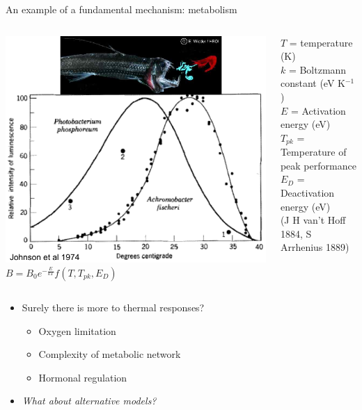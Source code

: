 \documentclass[xcolor=x11names,handout,compress]{beamer}
\renewcommand{\(}{\begin{columns}}
\renewcommand{\)}{\end{columns}}
\newcommand{\<}[1]{\begin{column}{#1}}
\renewcommand{\>}{\end{column}}
\begin{document}
\begin{frame}{An example of a fundamental mechanism: metabolism}
      
\begin{columns}[c]
  \column{2.1in}
    \pause
      \includegraphics[width=\textwidth]{graphics/Photobacterium.pdf}
  \pause
  \column{2.7in}
    $B = B_0 \boxed {e^{-\frac{E}{kT}}}f(T,T_{pk},E_D)$\\
    \vspace{10pt}
    \raggedright{$T$ = temperature (K)\\
     $k$ = Boltzmann constant (eV K$^{-1}$)}\\
     $E$ = Activation energy (eV)\\
     $T_{pk}$ = Temperature of peak performance\\
     $E_D$ = Deactivation energy (eV)\\
    {\small (J H van't Hoff 1884, S Arrhenius 1889)}
\end{columns}

\begin{itemize}\setlength{\itemindent}{0em}
  \pause
  \item Surely there is more to thermal responses?
    \begin{itemize}\setlength{\itemindent}{-1em}
     \item Oxygen limitation
     \item Complexity of metabolic network
     \item Hormonal regulation
    \end{itemize}
    \pause
  \item \textit{What about alternative models?}\\

\end{itemize}
 
\end{frame}
\end{document}
